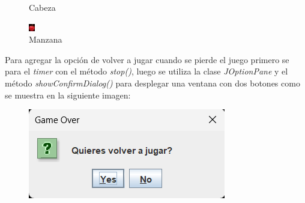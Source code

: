 \documentclass[11pt, twocolumn]{article}
\begin{document}
\begin{figure}[ht]
\begin{minipage}[c]{0.25\columnwidth}
      \caption*{Cabeza}
    \end{minipage}
    \begin{minipage}[r]{0.2\columnwidth}
      \includegraphics[width=\columnwidth, right]{apple.jpg}
      \caption*{Manzana}
    \end{minipage}
  \end{figure}

  Para agregar la opción de volver a jugar cuando se pierde el juego primero se para el \textit{timer} con el método \textit{stop()}, luego se utiliza la clase \textit{JOptionPane} y el método \textit{showConfirmDialog()} para desplegar una ventana con dos botones como se muestra en la siguiente imagen:

  \begin{figure}[ht]
    \includegraphics[width=0.6\columnwidth, center]{v1.png}
  \end{figure}
\end{document}
